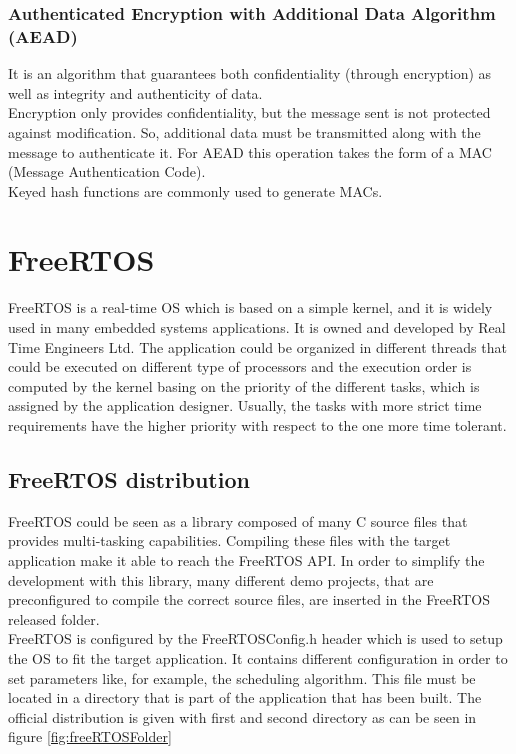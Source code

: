 \subsubsection{Authenticated Encryption with Additional Data Algorithm (AEAD)}
It is an algorithm that guarantees both confidentiality (through encryption) as well as integrity and authenticity of data.\\
Encryption only provides confidentiality, but the message sent is not protected against modification. So, additional data must be transmitted along with the message to authenticate it. For AEAD this operation takes the form of a MAC (Message Authentication Code).\\
Keyed hash functions are commonly used to generate MACs.


\section{FreeRTOS}\label{freertos}
FreeRTOS is a real-time OS which is based on a simple kernel, and it is widely used in many embedded systems applications. It is owned and developed by Real Time Engineers Ltd. 
The application could be organized in different threads that could be executed on different type of processors and the execution order is computed by the kernel basing on the priority of the different tasks, which is assigned by the application designer. Usually, the tasks with more strict time requirements have the higher priority with respect to the one more time tolerant. 

\subsection{FreeRTOS distribution}\label{freertosdistribution}
FreeRTOS could be seen as a library composed of many C source files that provides multi-tasking capabilities. Compiling these files with the target application make it able to reach the FreeRTOS API. In order to simplify the development with this library, many different demo projects, that are preconfigured to compile the correct source files, are inserted in the FreeRTOS released folder.\\
FreeRTOS is configured by the FreeRTOSConfig.h header which is used to setup the OS to fit the target application. It contains different configuration in order to set parameters like, for example, the scheduling algorithm. This file must be located in a directory that is part of the application that has been built. 
The official distribution is given with first and second directory as can be seen in figure \ref{fig:freeRTOSFolder} 


